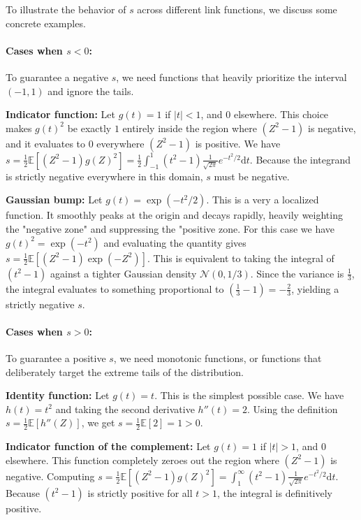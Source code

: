 To illustrate the behavior of $s$ across different link functions, we discuss some concrete examples.
\paragraph{Cases when $s < 0$:} To guarantee a negative $s$, we need functions that heavily prioritize the interval $(-1, 1)$ and ignore the tails.

{\bf Indicator function:} Let $g(t) = 1$ if $|t| < 1$, and $0$ elsewhere. This choice makes $g(t)^2$ be exactly $1$ entirely inside the region where $(Z^2 - 1)$ is negative, and it evaluates to $0$ everywhere $(Z^2 - 1)$ is positive. We have $s = \frac{1}{2}\mathbb{E}[(Z^2 - 1)g(Z)^2] = \frac{1}{2}\int_{-1}^{1} (t^2 - 1) \frac{1}{\sqrt{2\pi}} e^{-t^2/2} \mathrm d t$. Because the integrand is strictly negative everywhere in this domain, $s$ must be negative.

{\bf Gaussian bump:} Let $g(t) = \exp(-t^2/2)$. This is a very a localized function. It smoothly peaks at the origin and decays rapidly, heavily weighting the "negative zone" and suppressing the "positive zone. For this case we have $g(t)^2 = \exp(-t^2)$ and evaluating the quantity gives $s = \frac{1}{2}\mathbb{E}[(Z^2 - 1)\exp(-Z^2)]$. This is equivalent to taking the integral of $(t^2 - 1)$ against a tighter Gaussian density $\mathcal{N}(0, 1/3)$. Since the variance is $\frac{1}{3}$, the integral evaluates to something proportional to $(\frac{1}{3} - 1) = -\frac{2}{3}$, yielding a strictly negative $s$.

\paragraph{Cases when $s > 0$:}
To guarantee a positive $s$, we need monotonic functions, or functions that deliberately target the extreme tails of the distribution.

{\bf Identity function:} Let $g(t) = t$. This is the simplest possible case. We have $h(t) = t^2$ and taking the second derivative $h''(t) = 2$. Using the definition $s = \frac{1}{2}\mathbb{E}[h''(Z)]$, we get $s = \frac{1}{2} \mathbb{E}[2] = 1 > 0$.

{\bf Indicator function of the complement:} Let $g(t) = 1$ if $|t| > 1$, and $0$ elsewhere. This function completely zeroes out the region where $(Z^2 - 1)$ is negative. Computing $s = \frac{1}{2}\mathbb{E}[(Z^2 - 1)g(Z)^2] = \int_{1}^{\infty} (t^2 - 1) \frac{1}{\sqrt{2\pi}} e^{-t^2/2} \mathrm d t$. Because $(t^2 - 1)$ is strictly positive for all $t > 1$, the integral is definitively positive.


